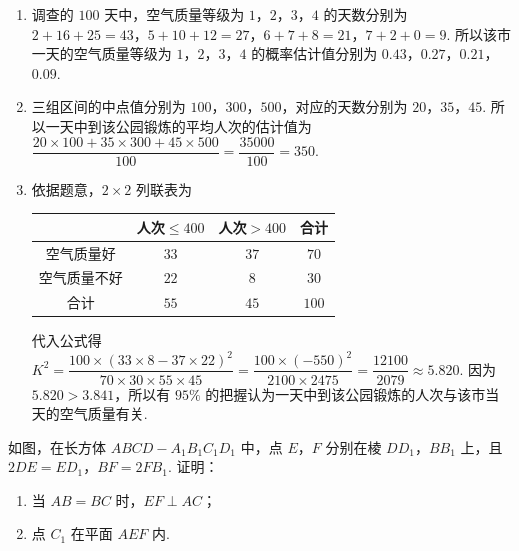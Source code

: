 \begin{solution}
\begin{enumerate}
    \item 调查的 \(100\) 天中，空气质量等级为 \(1\)，\(2\)，\(3\)，\(4\) 的天数分别为 \(2+16+25=43\)，\(5+10+12=27\)，\(6+7+8=21\)，\(7+2+0=9\). 所以该市一天的空气质量等级为 \(1\)，\(2\)，\(3\)，\(4\) 的概率估计值分别为 \(0.43\)，\(0.27\)，\(0.21\)，\(0.09\).
    \item 三组区间的中点值分别为 \(100\)，\(300\)，\(500\)，对应的天数分别为 \(20\)，\(35\)，\(45\). 所以一天中到该公园锻炼的平均人次的估计值为 \(\dfrac{20\times100+35\times300+45\times500}{100}=\dfrac{35000}{100}=350\).
    \item 依据题意，\(2\times 2\) 列联表为
    \begin{center}
    \begin{tabular}{c|cc|c}
     & 人次\(\le 400\) & 人次\(>400\) & 合计 \\
    \hline
    空气质量好 & \(33\) & \(37\) & \(70\) \\
    空气质量不好 & \(22\) & \(8\) & \(30\) \\
    \hline
    合计 & \(55\) & \(45\) & \(100\)
    \end{tabular}
    \end{center}
    代入公式得 \(K^2=\dfrac{100\times(33\times8-37\times22)^2}{70\times30\times55\times45}=\dfrac{100\times(-550)^2}{2100\times2475}=\dfrac{12100}{2079}\approx5.820\). 因为 \(5.820>3.841\)，所以有 \(95\%\) 的把握认为一天中到该公园锻炼的人次与该市当天的空气质量有关.
\end{enumerate}
\end{solution}

\begin{problem}
如图，在长方体 \(ABCD-A_1B_1C_1D_1\) 中，点 \(E\)，\(F\) 分别在棱 \(DD_1\)，\(BB_1\) 上，且 \(2DE=ED_1\)，\(BF=2FB_1\). 证明：

\begin{enumerate}
    \item 当 \(AB=BC\) 时，\(EF\perp AC\)；
    \item 点 \(C_1\) 在平面 \(AEF\) 内.
\end{enumerate}

\end{problem}

